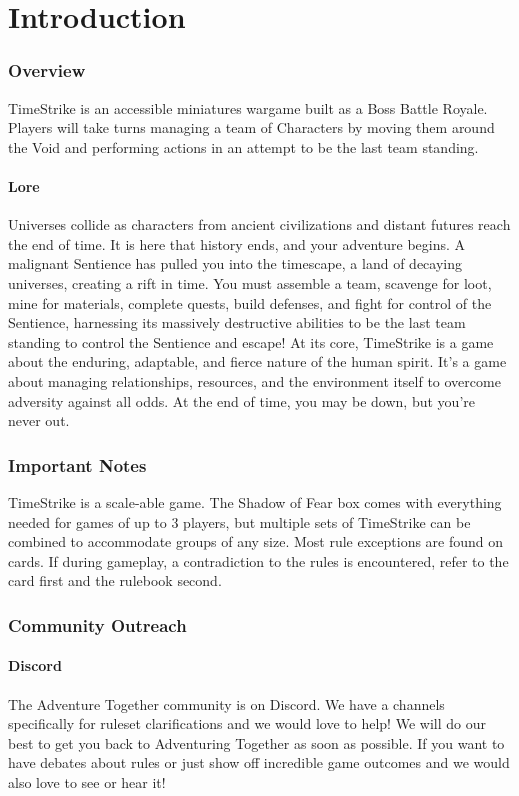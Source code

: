 \documentclass[../main.tex]{subfiles}
\begin{document}
\chapter{Introduction}

\subsection{Overview}
TimeStrike is an accessible miniatures wargame built as a Boss Battle Royale. Players will take turns managing a team of Characters by moving them around the Void and performing actions in an attempt to be the last team standing. 

\subsubsection{Lore}
Universes collide as characters from ancient civilizations and distant futures reach the end of time. It is here that history ends, and your adventure begins. A malignant Sentience has pulled you into the timescape, a land of decaying universes, creating a rift in time. You must assemble a team, scavenge for loot, mine for materials, complete quests, build defenses, and fight for control of the Sentience, harnessing its massively destructive abilities to be the last team standing to control the Sentience and escape! At its core, TimeStrike is a game about the enduring, adaptable, and fierce nature of the human spirit. It’s a game about managing relationships, resources, and the environment itself to overcome adversity against all odds. At the end of time, you may be down, but you’re never out.

\subsection{Important Notes}
TimeStrike is a scale-able game. The Shadow of Fear box comes with everything needed for games of up to 3 players, but multiple sets of TimeStrike can be combined to accommodate groups of any size.
Most rule exceptions are found on cards. If during gameplay, a contradiction to the rules is encountered, refer to the card first and the rulebook second.

\subsection{Community Outreach}
\subsubsection{Discord}
The Adventure Together community is on Discord. We have a channels specifically for ruleset clarifications and we would love to help!  We will do our best to get you back to Adventuring Together as soon as possible. If you want to have debates about rules or just show off incredible game outcomes and we would also love to see or hear it!
\end{document}
